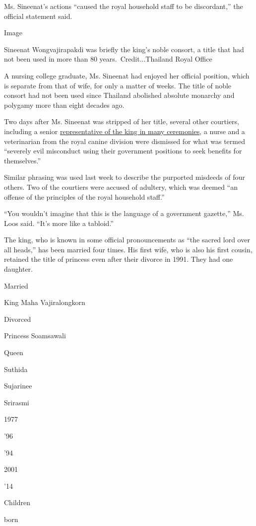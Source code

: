 Ms. Sineenat's actions ``caused the royal household staff to be
discordant,'' the official statement said.

Image

Sineenat Wongvajirapakdi was briefly the king's noble consort, a title
that had not been used in more than 80 years.~Credit...Thailand Royal
Office

A nursing college graduate, Ms. Sineenat had enjoyed her official
position, which is separate from that of wife, for only a matter of
weeks. The title of noble consort had not been used since Thailand
abolished absolute monarchy and polygamy more than eight decades ago.

Two days after Ms. Sineenat was stripped of her title, several other
courtiers, including a senior
\href{http://www.ratchakitcha.soc.go.th/DATA/PDF/2562/B/056/T_0003.PDF}{representative
of the king in many ceremonies}, a nurse and a veterinarian from the
royal canine division were dismissed for what was termed ``severely evil
misconduct using their government positions to seek benefits for
themselves.''

Similar phrasing was used last week to describe the purported misdeeds
of four others. Two of the courtiers were accused of adultery, which was
deemed ``an offense of the principles of the royal household staff.''

``You wouldn't imagine that this is the language of a government
gazette,'' Ms. Loos said. ``It's more like a tabloid.''

The king, who is known in some official pronouncements as ``the sacred
lord over all heads,'' has been married four times. His first wife, who
is also his first cousin, retained the title of princess even after
their divorce in 1991. They had one daughter.

Married

King Maha Vajiralongkorn

Divorced

Princess Soamsawali

Queen

Suthida

Sujarinee

Srirasmi

1977

'96

'94

2001

'14

Children

born

